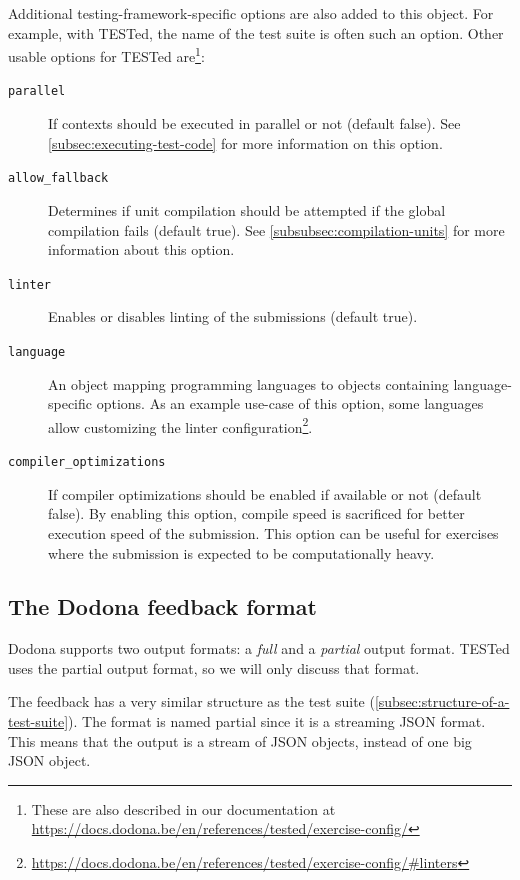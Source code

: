 \documentclass[../main]{subfiles}
\begin{document}
Additional testing-framework-specific options are also added to this object.
For example, with TESTed, the name of the test suite is often such an option.
Other usable options for TESTed are\footnote{These are also described in our documentation at \url{https://docs.dodona.be/en/references/tested/exercise-config/}}:

\begin{description}
    \item[\texttt{parallel}] If contexts should be executed in parallel or not (default false). See \cref{subsec:executing-test-code} for more information on this option.
    \item[\texttt{allow\_fallback}] Determines if unit compilation should be attempted if the global compilation fails (default true). See \cref{subsubsec:compilation-units} for more information about this option.
    \item[\texttt{linter}] Enables or disables linting of the submissions (default true).
    \item[\texttt{language}] An object mapping programming languages to objects containing language-specific options.
    As an example use-case of this option, some languages allow customizing the linter configuration\footnote{\url{https://docs.dodona.be/en/references/tested/exercise-config/\#linters}}.
    \item[\texttt{compiler\_optimizations}] If compiler optimizations should be enabled if available or not (default false).
    By enabling this option, compile speed is sacrificed for better execution speed of the submission.
    This option can be useful for exercises where the submission is expected to be computationally heavy.
\end{description}

\subsection{The Dodona feedback format}\label{subsec:dodona-output}

Dodona supports two output formats: a \emph{full} and a \emph{partial} output format.
TESTed uses the partial output format, so we will only discuss that format.

The feedback has a very similar structure as the test suite (\cref{subsec:structure-of-a-test-suite}).
The format is named partial since it is a streaming JSON format.
This means that the output is a stream of JSON objects, instead of one big JSON object.
\end{document}
